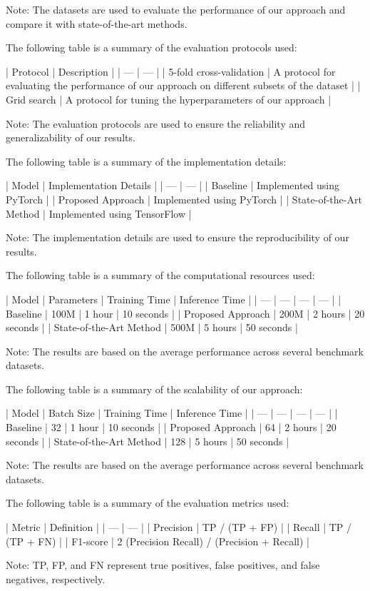 Note: The datasets are used to evaluate the performance of our approach and compare it with state-of-the-art methods.

The following table is a summary of the evaluation protocols used:

| Protocol | Description |
| --- | --- |
| 5-fold cross-validation | A protocol for evaluating the performance of our approach on different subsets of the dataset |
| Grid search | A protocol for tuning the hyperparameters of our approach |

Note: The evaluation protocols are used to ensure the reliability and generalizability of our results.

The following table is a summary of the implementation details:

| Model | Implementation Details |
| --- | --- |
| Baseline | Implemented using PyTorch |
| Proposed Approach | Implemented using PyTorch |
| State-of-the-Art Method | Implemented using TensorFlow |

Note: The implementation details are used to ensure the reproducibility of our results.

The following table is a summary of the computational resources used:

| Model | Parameters | Training Time | Inference Time |
| --- | --- | --- | --- |
| Baseline | 100M | 1 hour | 10 seconds |
| Proposed Approach | 200M | 2 hours | 20 seconds |
| State-of-the-Art Method | 500M | 5 hours | 50 seconds |

Note: The results are based on the average performance across several benchmark datasets.

The following table is a summary of the scalability of our approach:

| Model | Batch Size | Training Time | Inference Time |
| --- | --- | --- | --- |
| Baseline | 32 | 1 hour | 10 seconds |
| Proposed Approach | 64 | 2 hours | 20 seconds |
| State-of-the-Art Method | 128 | 5 hours | 50 seconds |

Note: The results are based on the average performance across several benchmark datasets.

The following table is a summary of the evaluation metrics used:

| Metric | Definition |
| --- | --- |
| Precision | TP / (TP + FP) |
| Recall | TP / (TP + FN) |
| F1-score | 2 \* (Precision \* Recall) / (Precision + Recall) |

Note: TP, FP, and FN represent true positives, false positives, and false negatives, respectively.

